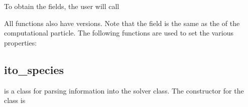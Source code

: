 \documentclass[letterpaper,10pt,english]{sphinxmanual}
\begin{document}
To obtain the fields, the user will call

\begin{sphinxVerbatim}[commandchars=\\\{\},formatcom=\scriptsize]
 
 
 
 
\end{sphinxVerbatim}

All functions also have  versions.
Note that the field  is the same as the  of the computational particle.
The following functions are used to set the various properties:

\begin{sphinxVerbatim}[commandchars=\\\{\},formatcom=\scriptsize]
  
  
  
  
\end{sphinxVerbatim}


\subsection{ito\_species}
\label{\detokenize{Solvers/Ito:ito-species}}\label{\detokenize{Solvers/Ito:chap-ito-species}}
 is a class for parsing information into the solver class.
The constructor for the  class is

\begin{sphinxVerbatim}[commandchars=\\\{\},formatcom=\scriptsize]
           
\end{sphinxVerbatim}
\end{document}
